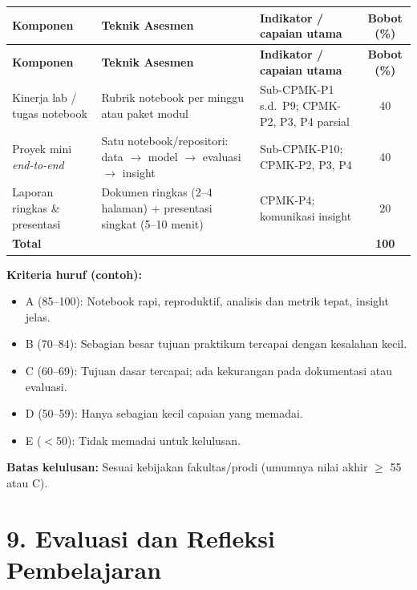 \documentclass[12pt,a4paper]{article}
\begin{document}
\begin{longtable}{|>{\raggedright\arraybackslash}p{3cm}|>{\raggedright\arraybackslash}p{4.2cm}|>{\raggedright\arraybackslash}p{5.8cm}|c|}
\hline
\textbf{Komponen} & \textbf{Teknik Asesmen} & \textbf{Indikator / capaian utama} & \textbf{Bobot (\%)} \\
\hline
\endfirsthead
\hline
\textbf{Komponen} & \textbf{Teknik Asesmen} & \textbf{Indikator / capaian utama} & \textbf{Bobot (\%)} \\
\hline
\endhead
\hline
\endfoot

Kinerja lab / tugas notebook & Rubrik notebook per minggu atau paket modul & Sub-CPMK-P1 s.d.\ P9; CPMK-P2, P3, P4 parsial & 40 \\
\hline
Proyek mini \textit{end-to-end} & Satu notebook/repositori: data $\rightarrow$ model $\rightarrow$ evaluasi $\rightarrow$ insight & Sub-CPMK-P10; CPMK-P2, P3, P4 & 40 \\
\hline
Laporan ringkas \& presentasi & Dokumen ringkas (2--4 halaman) + presentasi singkat (5--10 menit) & CPMK-P4; komunikasi insight & 20 \\
\hline
\textbf{Total} & & & \textbf{100} \\
\hline
\end{longtable}

\textbf{Kriteria huruf (contoh):}
\begin{itemize}[leftmargin=*]
  \item A (85--100): Notebook rapi, reproduktif, analisis dan metrik tepat, insight jelas.
  \item B (70--84): Sebagian besar tujuan praktikum tercapai dengan kesalahan kecil.
  \item C (60--69): Tujuan dasar tercapai; ada kekurangan pada dokumentasi atau evaluasi.
  \item D (50--59): Hanya sebagian kecil capaian yang memadai.
  \item E ($<$50): Tidak memadai untuk kelulusan.
\end{itemize}

\textbf{Batas kelulusan:} Sesuai kebijakan fakultas/prodi (umumnya nilai akhir $\geq$ 55 atau C).

\vspace{0.5cm}

\section*{9. Evaluasi dan Refleksi Pembelajaran}
\end{document}
